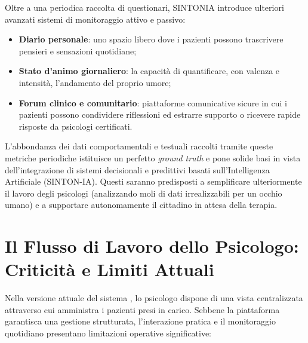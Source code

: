 Oltre a una periodica raccolta di questionari, SINTONIA introduce ulteriori avanzati sistemi di monitoraggio attivo e passivo:
\begin{itemize}
    \item \textbf{Diario personale}: uno spazio libero dove i pazienti possono trascrivere pensieri e sensazioni quotidiane;
    \item \textbf{Stato d'animo giornaliero}: la capacità di quantificare, con valenza e intensità, l'andamento del proprio umore;
    \item \textbf{Forum clinico e comunitario}: piattaforme comunicative sicure in cui i pazienti possono condividere riflessioni ed estrarre supporto o ricevere rapide risposte da psicologi certificati.
\end{itemize}

L'abbondanza dei dati comportamentali e testuali raccolti tramite queste metriche periodiche istituisce un perfetto \textit{ground truth} e pone solide basi in vista dell'integrazione di sistemi decisionali e predittivi basati sull'Intelligenza Artificiale (SINTON-IA). Questi saranno predisposti a semplificare ulteriormente il lavoro degli psicologi (analizzando moli di dati irrealizzabili per un occhio umano) e a supportare autonomamente il cittadino in attesa della terapia.

\clearpage
\section{Il Flusso di Lavoro dello Psicologo: Criticità e Limiti Attuali}
\label{sec:flusso_psicologo}

Nella versione attuale del sistema \cite{sintonia_repo}, lo psicologo dispone di una vista centralizzata attraverso cui amministra i pazienti presi in carico. Sebbene la piattaforma garantisca una gestione strutturata, l'interazione pratica e il monitoraggio quotidiano presentano limitazioni operative significative:

